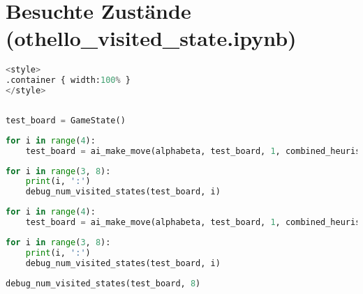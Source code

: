 \hypertarget{besuchte-zustuxe4nde-othello_visited_state.ipynb}{%
\section{Besuchte Zustände
(othello\_visited\_state.ipynb)}\label{besuchte-zustuxe4nde-othello_visited_state.ipynb}}

\label{sec:visitedstates}

\begin{lstlisting}[language=Python]
%%HTML
<style>
.container { width:100% }
</style>
\end{lstlisting}

\begin{lstlisting}[language=Python]
%run othello_test_util.ipynb
\end{lstlisting}

\begin{lstlisting}[language=Python]
test_board = GameState()
\end{lstlisting}

\begin{lstlisting}[language=Python]
for i in range(4):
    test_board = ai_make_move(alphabeta, test_board, 1, combined_heuristic)
\end{lstlisting}

\begin{lstlisting}[language=Python]
for i in range(3, 8):
    print(i, ':')
    debug_num_visited_states(test_board, i)
\end{lstlisting}

\begin{lstlisting}[language=Python]
for i in range(4):
    test_board = ai_make_move(alphabeta, test_board, 1, combined_heuristic)
\end{lstlisting}

\begin{lstlisting}[language=Python]
for i in range(3, 8):
    print(i, ':')
    debug_num_visited_states(test_board, i)
\end{lstlisting}

\begin{lstlisting}[language=Python]
debug_num_visited_states(test_board, 8)
\end{lstlisting}
